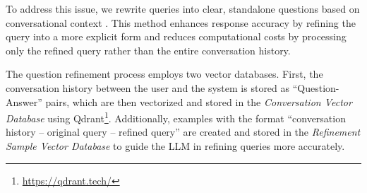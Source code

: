 \documentclass[runningheads]{llncs}
\begin{document}

To address this issue, we rewrite queries into  clear, standalone questions based on conversational context \cite{10.1145/3459637.3482164}. This method enhances response accuracy by refining the query into a more explicit form and reduces computational costs by processing only the refined query rather than the entire conversation history.

%     

The question refinement process employs two vector databases. First, the conversation history between the user and the system is stored as ``Question-Answer'' pairs, which are then vectorized and stored in the \textit{Conversation Vector Database} using Qdrant\footnote{\url{https://qdrant.tech/}}. Additionally, examples with the format ``conversation history -- original query -- refined query'' are created and stored in the \textit{Refinement Sample Vector Database} to guide the LLM in refining queries more accurately.

\end{document}
